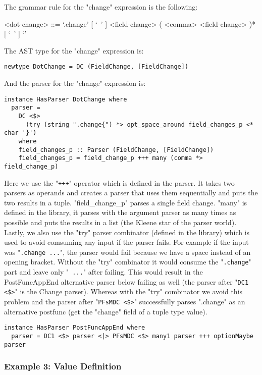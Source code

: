 \documentclass{article}
\begin{document}
The grammar rule for the "change" expression is the following:
\begin{grammar}
<dot-change> ::=
`.change{' [ `\ ' ] <field-change> ( <comma> <field-change> )* [ `\ ' ] `}'
\\
\end{grammar}
The AST type for the "change" expression is:
\begin{verbatim}
newtype DotChange = DC (FieldChange, [FieldChange])

\end{verbatim}
And the parser for the "change" expression is:
\begin{verbatim}
instance HasParser DotChange where
  parser =
    DC <$>
      (try (string ".change{") *> opt_space_around field_changes_p <* char '}')
    where
    field_changes_p :: Parser (FieldChange, [FieldChange])
    field_changes_p = field_change_p +++ many (comma *> field_change_p)

\end{verbatim}
Here we use the "\verb|+++|" operator which is defined in the parser. It takes
two parsers as operands and creates a parser that uses them sequentially and
puts the two results in a tuple. "field_change_p" parses a single field change.
"many" is defined in the library, it parses with the argument parser as many
times as possible and puts the results in a list (the Kleene star of the parser
world).  Lastly, we also use the "try" parser combinator (defined in the
library) which is used to avoid comsuming any input if the parser fails. For
example if the input was "\verb|.change ...|", the parser would fail because we
have a space instead of an opening bracket.  Without the "try" combinator it
would consume the "\verb|.change|" part and leave only "\verb| ...|" after
failing. This would result in the PostFuncAppEnd alternative parser below
failing as well (the parser after "\verb|DC1 <$>|" is the Change parser).
Whereas with the "try" combinator we avoid this problem and the parser after
"\verb|PFsMDC <$>|" successfully parses ".change" as an alternative postfunc
(get the "change" field of a tuple type value).

\begin{verbatim}
instance HasParser PostFuncAppEnd where
  parser = DC1 <$> parser <|> PFsMDC <$> many1 parser +++ optionMaybe parser
\end{verbatim}


\subsubsection{Example 3: Value Definition}
\end{document}
